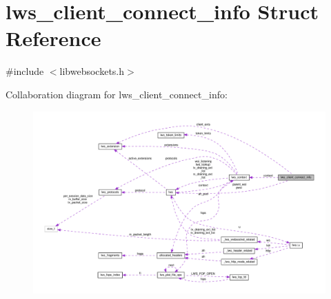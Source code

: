 \hypertarget{structlws__client__connect__info}{}\section{lws\+\_\+client\+\_\+connect\+\_\+info Struct Reference}
\label{structlws__client__connect__info}


{\ttfamily \#include $<$libwebsockets.\+h$>$}



Collaboration diagram for lws\+\_\+client\+\_\+connect\+\_\+info\+:
\nopagebreak
\begin{figure}[H]
\begin{center}
\leavevmode
\includegraphics[width=350pt]{structlws__client__connect__info__coll__graph}
\end{center}
\end{figure}
